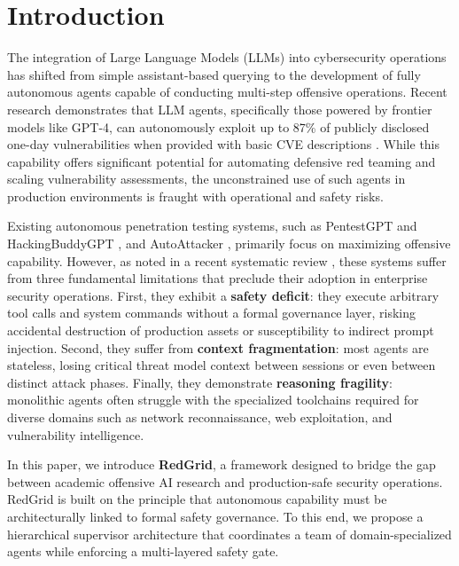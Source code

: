 \documentclass[conference,compsoc]{IEEEtran}
\begin{document}
\section{Introduction} \label{sec:intro}
The integration of Large Language Models (LLMs) into cybersecurity operations has shifted from simple assistant-based querying to the development of fully autonomous agents capable of conducting multi-step offensive operations. Recent research demonstrates that LLM agents, specifically those powered by frontier models like GPT-4, can autonomously exploit up to 87\% of publicly disclosed one-day vulnerabilities when provided with basic CVE descriptions \cite{fang2024}. While this capability offers significant potential for automating defensive red teaming and scaling vulnerability assessments, the unconstrained use of such agents in production environments is fraught with operational and safety risks.

Existing autonomous penetration testing systems, such as PentestGPT \cite{pentestgpt} and HackingBuddyGPT \cite{hackingbuddygpt}, and AutoAttacker \cite{autoattacker}, primarily focus on maximizing offensive capability. However, as noted in a recent systematic review \cite{xu2024sok}, these systems suffer from three fundamental limitations that preclude their adoption in enterprise security operations. First, they exhibit a \textbf{safety deficit}: they execute arbitrary tool calls and system commands without a formal governance layer, risking accidental destruction of production assets or susceptibility to indirect prompt injection. Second, they suffer from \textbf{context fragmentation}: most agents are stateless, losing critical threat model context between sessions or even between distinct attack phases. Finally, they demonstrate \textbf{reasoning fragility}: monolithic agents often struggle with the specialized toolchains required for diverse domains such as network reconnaissance, web exploitation, and vulnerability intelligence.

In this paper, we introduce \textbf{RedGrid}, a framework designed to bridge the gap between academic offensive AI research and production-safe security operations. RedGrid is built on the principle that autonomous capability must be architecturally linked to formal safety governance. To this end, we propose a hierarchical supervisor architecture that coordinates a team of domain-specialized agents while enforcing a multi-layered safety gate.
\end{document}
